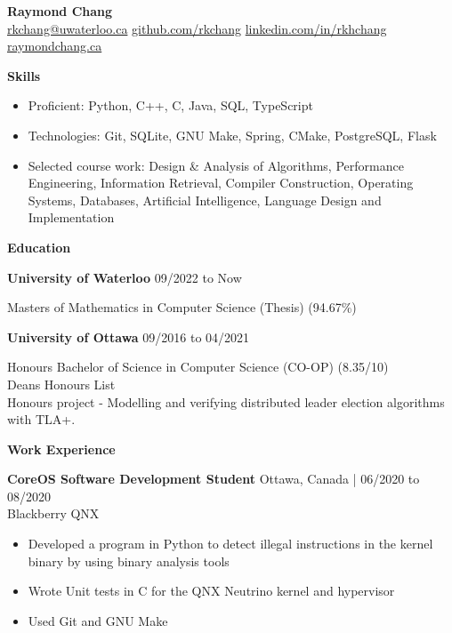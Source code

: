 \documentclass[10pt]{article}
\begin{document}
\begin{center}
    {\huge\textbf{Raymond Chang}} \\
     \href{mailto:rkchang@uwaterloo.ca}{rkchang@uwaterloo.ca}  \space\space
     \href{https://github.com/rkchang}{github.com/rkchang} \space\space
     \href{https://linkedin.com/in/rkhchang}{linkedin.com/in/rkhchang} \\
     \href{https://raymondchang.ca/}{raymondchang.ca} \\ \end{center}

{\Large\textbf{Skills}}\space \hrulefill
\begin{itemize}[noitemsep]
    \item Proficient: Python, C++, C, Java, SQL, TypeScript
    \item Technologies: Git, SQLite, GNU Make, Spring, CMake, PostgreSQL, Flask
    \item Selected course work:  Design \& Analysis of Algorithms, Performance Engineering, Information Retrieval, Compiler Construction, Operating Systems, Databases, Artificial Intelligence, Language Design and Implementation
\end{itemize}

\smallskip

{\Large\textbf{Education}}\space \hrulefill

\textbf{University of Waterloo} \hfill  09/2022 to Now

Masters of Mathematics in Computer Science (Thesis) (94.67\%)

\hfill

\textbf{University of Ottawa} \hfill 09/2016 to 04/2021

Honours Bachelor of Science in Computer Science (CO-OP) (8.35/10) \\ Deans Honours List \\ Honours project - Modelling and verifying distributed leader election algorithms with TLA+.
\bigskip

{\Large\textbf{Work Experience}}\space \hrulefill

\textbf{CoreOS Software Development Student} \hfill Ottawa, Canada | 06/2020 to 08/2020 \\
Blackberry QNX
\begin{itemize}[noitemsep]
    \item Developed a program in Python to detect illegal instructions in the kernel binary by using binary analysis tools
    \item Wrote Unit tests in C for the QNX Neutrino kernel and hypervisor
    \item Used Git and GNU Make
\end{itemize}
\end{document}

